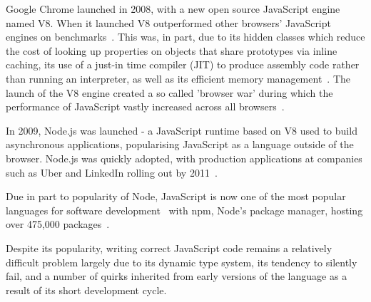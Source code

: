 \documentclass[]{final_report}
\begin{document}
Google Chrome launched in 2008, with a new open source JavaScript engine named V8. When it launched V8 outperformed other browsers' JavaScript engines on benchmarks~\cite{chromebenchmarks}. This was, in part, due to its hidden classes which reduce the cost of looking up properties on objects that share prototypes via inline caching, its use of a just-in time compiler (JIT) to produce assembly code rather than running an interpreter, as well as its efficient memory management~\cite{chromeengine, chromeengine2}. The launch of the V8 engine created a so called 'browser war' during which the performance of JavaScript vastly increased across all browsers~\cite{knowyourenginesmozilla}.

In 2009, Node.js was launched - a JavaScript runtime based on V8 used to build asynchronous applications, popularising JavaScript as a language outside of the browser. Node.js was quickly adopted, with production applications at companies such as Uber and LinkedIn rolling out by 2011~\cite{linkedinusesnode, uberusesnode}. 

Due in part to popularity of Node, JavaScript is now one of the most popular languages for software development~\cite{stackoverflowsurvey, tiobeindex2017nov} with npm, Node's package manager, hosting over 475,000 packages~\cite{npm}.

Despite its popularity, writing correct JavaScript code remains a relatively difficult problem largely due to its dynamic type system, its tendency to silently fail, and a number of quirks inherited from early versions of the language as a result of its short development cycle.
\end{document}
